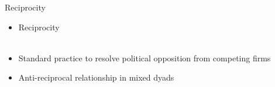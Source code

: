 \documentclass{beamer}
\begin{document}
\begin{frame}{Reciprocity}

\begin{itemize}
\item{Reciprocity}\\

\\

\justifying
\item{Standard practice to resolve political opposition from competing firms}\\
\item{Anti-reciprocal relationship in mixed dyads}

\end{itemize}




\end{frame}
\end{document}
